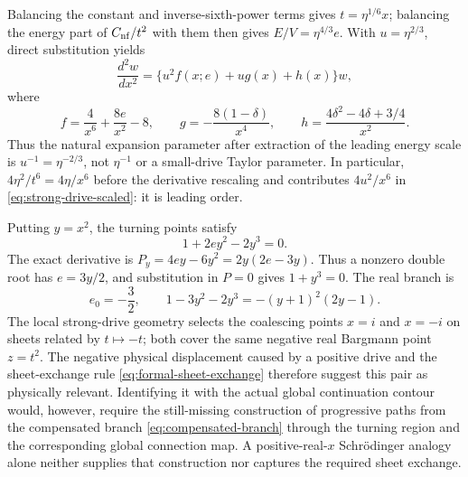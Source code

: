\documentclass[11pt]{article}
\theoremstyle{remark}
\begin{document}
Balancing the constant and inverse-sixth-power terms gives
\(t=\eta^{1/6}x\); balancing the energy part of \(C_{\rm nf}/t^2\) with them then
gives \(E/V=\eta^{4/3}e\).  With \(u=\eta^{2/3}\), direct substitution yields
\begin{equation}
 \frac{d^2w}{dx^2}=\{u^2f(x;e)+u g(x)+h(x)\}w,
 \label{eq:strong-drive-scaled}
\end{equation}
where
\begin{equation}
 f=\frac4{x^6}+\frac{8e}{x^2}-8,\qquad
 g=-\frac{8(1-\delta)}{x^4},\qquad
 h=\frac{4\delta^2-4\delta+3/4}{x^2}.
 \label{eq:strong-drive-fgh}
\end{equation}
Thus the natural expansion parameter after extraction of the leading energy
scale is \(u^{-1}=\eta^{-2/3}\), not \(\eta^{-1}\) or a small-drive Taylor
parameter.  In particular, \(4\eta^2/t^6=4\eta/x^6\) before the derivative
rescaling and contributes \(4u^2/x^6\) in
\eqref{eq:strong-drive-scaled}: it is leading order.

Putting \(y=x^2\), the turning points satisfy
\begin{equation}
 1+2ey^2-2y^3=0.
\end{equation}
The exact derivative is
\(P_y=4ey-6y^2=2y(2e-3y)\).  Thus a nonzero double root has
\(e=3y/2\), and substitution in \(P=0\) gives \(1+y^3=0\).  The real
branch is
\begin{equation}
 e_0=-\frac32,\qquad
 1-3y^2-2y^3=-(y+1)^2(2y-1).
 \label{eq:strong-drive-factorization}
\end{equation}
The local strong-drive geometry selects the coalescing points \(x=i\) and
\(x=-i\) on sheets related by \(t\mapsto-t\); both cover the same negative
real Bargmann point \(z=t^2\).  The negative physical displacement caused by
a positive drive and the sheet-exchange rule
\eqref{eq:formal-sheet-exchange} therefore suggest this pair as physically
relevant.  Identifying it with the actual global continuation contour would,
however, require the still-missing construction of progressive paths from the
compensated branch \eqref{eq:compensated-branch} through the turning region
and the corresponding global connection map.  A positive-real-\(x\)
Schr\"odinger analogy alone neither supplies that construction nor captures
the required sheet exchange.
\end{document}
